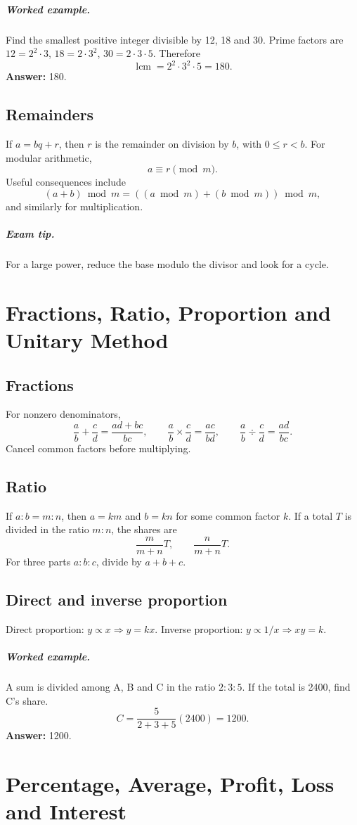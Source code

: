 \documentclass[12pt,a4paper,oneside]{book}
\newcommand{\ans}[1]{\textbf{Answer:} #1}
\newcommand{\tip}[1]{\paragraph{Exam tip.} #1}
\newcommand{\q}[2]{\paragraph{#1} #2}
\begin{document}
\q{Worked example.}{Find the smallest positive integer divisible by 12, 18 and 30.}
Prime factors are \(12=2^2\cdot3\), \(18=2\cdot3^2\), \(30=2\cdot3\cdot5\). Therefore
\[\operatorname{lcm}=2^2\cdot3^2\cdot5=180.\]
\ans{180.}

\section{Remainders}
If \(a=bq+r\), then \(r\) is the remainder on division by \(b\), with \(0\le r<b\). For modular arithmetic,
\[a\equiv r\pmod m.\]
Useful consequences include
\[(a+b)\bmod m=((a\bmod m)+(b\bmod m))\bmod m,\]
and similarly for multiplication.

\tip{For a large power, reduce the base modulo the divisor and look for a cycle.}

\chapter[Fractions and Ratios]{Fractions, Ratio, Proportion and Unitary Method}
\section{Fractions}
For nonzero denominators,
\[\frac ab+\frac cd=\frac{ad+bc}{bc},\qquad
\frac ab\times\frac cd=\frac{ac}{bd},\qquad
\frac ab\div\frac cd=\frac{ad}{bc}.\]
Cancel common factors before multiplying.

\section{Ratio}
If \(a:b=m:n\), then \(a=km\) and \(b=kn\) for some common factor \(k\). If a total \(T\) is divided in the ratio \(m:n\), the shares are
\[\frac{m}{m+n}T,\qquad \frac{n}{m+n}T.\]
For three parts \(a:b:c\), divide by \(a+b+c\).

\section{Direct and inverse proportion}
Direct proportion: \(y\propto x\Rightarrow y=kx\). Inverse proportion: \(y\propto1/x\Rightarrow xy=k\).

\q{Worked example.}{A sum is divided among A, B and C in the ratio \(2:3:5\). If the total is 2400, find C's share.}
\[C=\frac5{2+3+5}(2400)=1200.\]
\ans{1200.}

\chapter[Percentages and Profit]{Percentage, Average, Profit, Loss and Interest}
\end{document}
